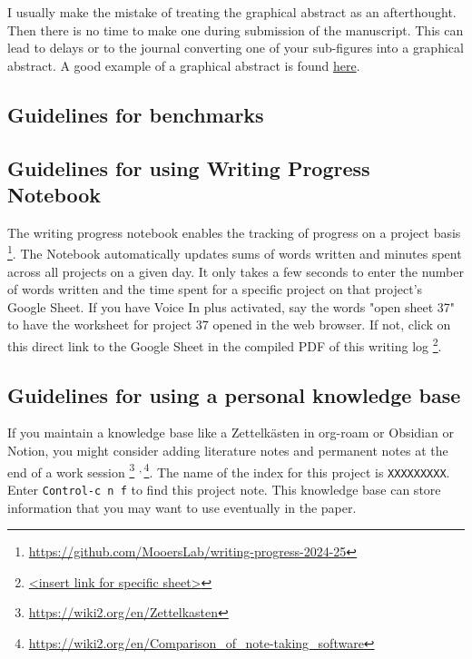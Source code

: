 \documentclass[11pt,letterpaper]{article}
\begin{document}
I usually make the mistake of treating the graphical abstract as an
afterthought. Then there is no time to make one during submission of the
manuscript. This can lead to delays or to the journal converting one of
your sub-figures into a graphical abstract. A good example of a
graphical abstract is found
\href{https://www.mdpi.com/2073-4352/11/3/273}{here}.


\subsection{Guidelines for benchmarks}
\label{sec:org338b36d}


\subsection{Guidelines for using Writing Progress Notebook}
\label{sec:orgac44e40}

The writing progress notebook enables the tracking of progress on a
project basis \footnote{\url{https://github.com/MooersLab/writing-progress-2024-25}}. The Notebook automatically updates sums of words
written and minutes spent across all projects on a given day. It only
takes a few seconds to enter the number of words written and the time
spent for a specific project on that project's Google Sheet. If you have
Voice In plus activated, say the words "open sheet 37" to have the
worksheet for project 37 opened in the web browser. If not, click on
this direct link to the Google Sheet in the compiled PDF of this writing
log \footnote{\href{<insert link for specific sheet>}{<insert link for specific sheet>}}.


\subsection{Guidelines for using a personal knowledge base}
\label{sec:org804adf1}

If you maintain a knowledge base like a Zettelkästen in org-roam or
Obsidian or Notion, you might consider adding literature notes and
permanent notes at the end of a work session \footnote{\url{https://wiki2.org/en/Zettelkasten}} \textsuperscript{,}\,\footnote{\url{https://wiki2.org/en/Comparison\_of\_note-taking\_software}}. The name of
the index for this project is \texttt{XXXXXXXXX}. Enter \texttt{Control-c n f} to find
this project note. This knowledge base can store information that you
may want to use eventually in the paper.
\end{document}
